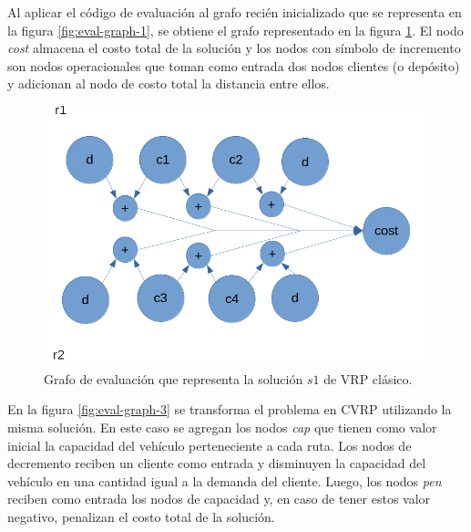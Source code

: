 Al aplicar el código de evaluación al grafo recién inicializado que se representa en la figura \ref{fig:eval-graph-1}, se obtiene el grafo representado en la figura \ref{fig:eval-graph-2}. El nodo \textit{cost} almacena el costo total de la solución y los nodos con símbolo de incremento son nodos operacionales que toman como entrada dos nodos clientes (o depósito) y adicionan al nodo de costo total la distancia entre ellos.

\begin{figure}
	\centering
	\includegraphics[width=0.9\linewidth]{Graphics/eval-graph-2}
	\caption{Grafo de evaluación que representa la solución $s1$ de VRP clásico.}
	\label{fig:eval-graph-2}
\end{figure}

En la figura \ref{fig:eval-graph-3} se transforma el problema en CVRP utilizando la misma solución. En este caso se agregan los nodos \textit{cap} que tienen como valor inicial la capacidad del vehículo perteneciente a cada ruta. Los nodos de decremento reciben un cliente como entrada y disminuyen la capacidad del vehículo en una cantidad igual a la demanda del cliente. Luego, los nodos \textit{pen} reciben como entrada los nodos de capacidad y, en caso de tener estos valor negativo, penalizan el costo total de la solución.

